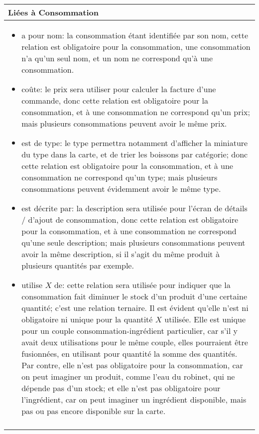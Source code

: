 \documentclass[a4paper,10pt]{article}
\begin{document}
\begin{tabu}{X}
\textbf{Liées à Consommation}\\
\toprule

\begin{itemize}
    \item a pour nom: la consommation étant identifiée par son nom, cette relation est obligatoire pour la consommation, une consommation n'a qu'un seul nom, et un nom ne correspond qu'à une consommation.
    \item coûte: le prix sera utiliser pour calculer la facture d'une commande, donc cette relation est obligatoire pour la consommation, et à une consommation ne correspond qu'un prix; mais plusieurs consommations peuvent avoir le même prix.
    \item est de type: le type permettra notamment d'afficher la miniature du type dans la carte, et de trier les boissons par catégorie; donc cette relation est obligatoire pour la consommation, et à une consommation ne correspond qu'un type; mais plusieurs consommations peuvent évidemment avoir le même type.
    \item est décrite par: la description sera utilisée pour l'écran de détails / d'ajout de consommation, donc cette relation est obligatoire pour la consommation, et à une consommation ne correspond qu'une seule description; mais plusieurs consommations peuvent avoir la même description, si il s'agit du même produit à plusieurs quantités par exemple.
    \item utilise $X$ de: cette relation sera utilisée pour indiquer que la consommation fait diminuer le stock d'un produit d'une certaine quantité; c'est une relation ternaire. Il est évident qu'elle n'est ni obligatoire ni unique pour la quantité $X$ utilisée. Elle est unique pour un couple consommation-ingrédient particulier, car s'il y avait deux utilisations pour le même couple, elles pourraient être fusionnées, en utilisant pour quantité la somme des quantités. Par contre, elle n'est pas obligatoire pour la consommation, car on peut imaginer un produit, comme l'eau du robinet, qui ne dépende pas d'un stock; et elle n'est pas obligatoire pour l'ingrédient, car on peut imaginer un ingrédient disponible, mais pas ou pas encore disponible sur la carte.
\end{itemize}
\\\\
\end{tabu}
\end{document}
